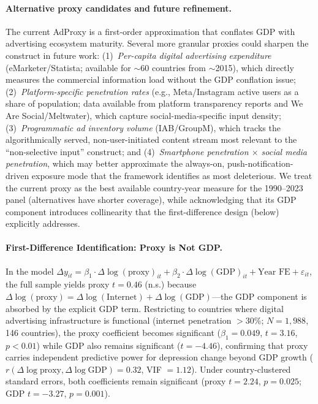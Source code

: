 \documentclass[a4paper,11pt,titlepage]{article}
\begin{document}
\paragraph{Alternative proxy candidates and future refinement.}
The current AdProxy is a first-order approximation that conflates GDP with advertising ecosystem maturity. Several more granular proxies could sharpen the construct in future work: (1)~\textit{Per-capita digital advertising expenditure} (eMarketer/Statista; available for $\sim$60 countries from $\sim$2015), which directly measures the commercial information load without the GDP conflation issue; (2)~\textit{Platform-specific penetration rates} (e.g., Meta/Instagram active users as a share of population; data available from platform transparency reports and We Are Social/Meltwater), which capture social-media-specific input density; (3)~\textit{Programmatic ad inventory volume} (IAB/GroupM), which tracks the algorithmically served, non-user-initiated content stream most relevant to the ``non-selective input'' construct; and (4)~\textit{Smartphone penetration $\times$ social media penetration}, which may better approximate the always-on, push-notification-driven exposure mode that the framework identifies as most deleterious. We treat the current proxy as the best available country-year measure for the 1990--2023 panel (alternatives have shorter coverage), while acknowledging that its GDP component introduces collinearity that the first-difference design (below) explicitly addresses.

\paragraph{First-Difference Identification: Proxy is Not GDP.}\label{sec:first-diff}
In the model $\Delta y_{it} = \beta_1 \cdot \Delta\log(\text{proxy})_{it} + \beta_2 \cdot \Delta\log(\text{GDP})_{it} + \text{Year FE} + \varepsilon_{it}$, the full sample yields proxy $t = 0.46$ (n.s.) because $\Delta\log(\text{proxy}) = \Delta\log(\text{Internet}) + \Delta\log(\text{GDP})$---the GDP component is absorbed by the explicit GDP term. Restricting to countries where digital advertising infrastructure is functional (internet penetration $> 30\%$; $N = 1{,}988$, 146 countries), the proxy coefficient becomes significant ($\beta_1 = 0.049$, $t = 3.16$, $p < 0.01$) while GDP also remains significant ($t = -4.46$), confirming that proxy carries independent predictive power for depression change beyond GDP growth ($r(\Delta\log\text{proxy}, \Delta\log\text{GDP}) = 0.32$, VIF $= 1.12$). Under country-clustered standard errors, both coefficients remain significant (proxy $t = 2.24$, $p = 0.025$; GDP $t = -3.27$, $p = 0.001$).
\end{document}
